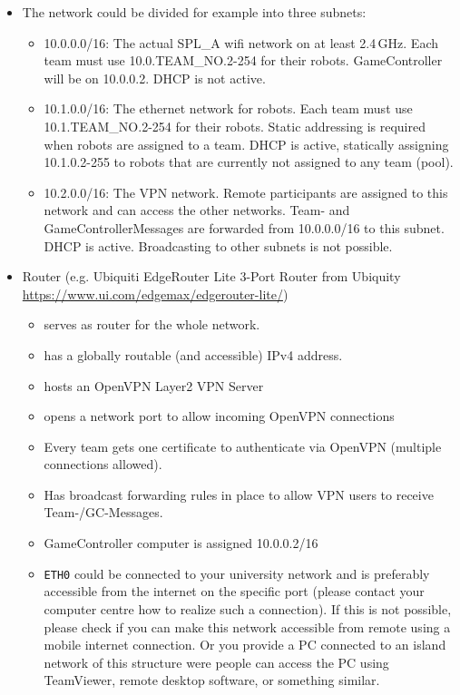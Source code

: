 \begin{itemize}
    \item  The network could be divided for example into three subnets:
    \begin{itemize}
        \item 10.0.0.0/16: The actual SPL\_A wifi network on at least 2.4\,GHz. Each team must use 10.0.TEAM\_NO.2-254 for their robots. GameController will be on 10.0.0.2. DHCP is not active.
        \item 10.1.0.0/16: The ethernet network for robots. Each team must use 10.1.TEAM\_NO.2-254 for their robots. Static addressing is required when robots are assigned to a team. DHCP is active, statically assigning 10.1.0.2-255 to robots that are currently not assigned to any team (pool).
        \item 10.2.0.0/16: The VPN network. Remote participants are assigned to this network and can access the other networks. Team- and GameControllerMessages are forwarded from 10.0.0.0/16 to this subnet. DHCP is active. Broadcasting to other subnets is not possible.
    \end{itemize}
    \item Router (e.g. Ubiquiti EdgeRouter Lite 3-Port Router from Ubiquity \url{https://www.ui.com/edgemax/edgerouter-lite/})
    \begin{itemize}
        \item serves as router for the whole network.
        \item has a globally routable (and accessible) IPv4 address.
        \item hosts an OpenVPN Layer2 VPN Server
        \item opens a network port to allow incoming OpenVPN connections
        \item Every team gets one certificate to authenticate via OpenVPN (multiple connections allowed).
        \item Has broadcast forwarding rules in place to allow VPN users to receive Team-/GC-Messages.
        \item GameController computer is assigned 10.0.0.2/16
        \item \texttt{ETH0} could be connected to your university network and is preferably accessible from the internet on the specific port (please contact your computer centre how to realize such a connection). If this is not possible, please check if you can make this network accessible from remote using a mobile internet connection. Or you provide a PC connected to an island network of this structure were people can access the PC using TeamViewer, remote desktop software, or something similar. 
    \end{itemize}
\end{itemize}

